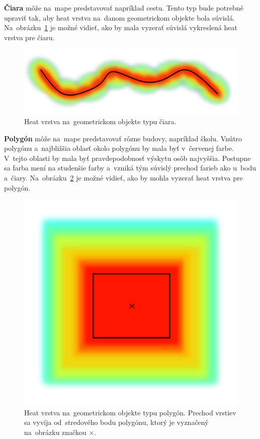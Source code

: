 \textbf{Čiara} môže na~mape predstavovať napríklad cestu. Tento typ bude potrebné upraviť tak, aby heat vrstva na~danom geometrickom objekte bola súvislá. Na~obrázku~\ref{fig:heat-line} je možné vidieť, ako by mala vyzerať súvislá vykreslená heat vrstva pre čiaru.
 
 \begin{figure}[ht]
     \centering
     \includegraphics[width=0.8\linewidth]{obrazky-figures/heat-line.pdf}
     \caption{Heat vrstva na~geometrickom objekte typu čiara.}
     \label{fig:heat-line}
 \end{figure}
 
 \textbf{Polygón} môže na~mape predstavovať rôzne budovy, napríklad školu. Vnútro polygónu a~najbližšia oblasť okolo polygónu by mala byť v~červenej farbe. V~tejto oblasti by mala byť pravdepodobnosť výskytu osôb najvyššia. Postupne sa farba mení na studenšie farby a~vzniká tým súvislý prechod farieb ako u~bodu a~čiary. Na~obrázku~\ref{fig:heat-polygon} je možné vidieť, ako by mohla vyzerať heat vrstva pre polygón.
 
 \begin{figure}[ht]
     \centering
     \includegraphics[width=0.5\linewidth]{obrazky-figures/heat-polygon.pdf}
     \caption{Heat vrstva na~geometrickom objekte typu polygón. Prechod vrstiev sa vyvíja od~stredového bodu polygónu, ktorý je vyznačený na~obrázku značkou \texttt{$\times$}.}
     \label{fig:heat-polygon}
 \end{figure}
 

